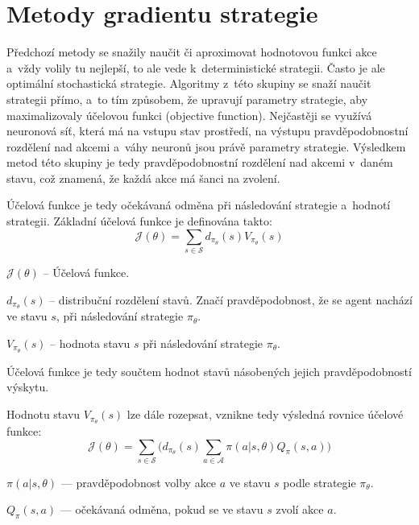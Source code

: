\section{Metody gradientu strategie}\label{subsec:gradientni_metody}
Předchozí metody se snažily naučit či aproximovat hodnotovou funkci akce a~vždy volily tu nejlepší, to ale vede k~deterministické strategii.
Často je ale optimální stochastická strategie.
Algoritmy z~této skupiny se snaží naučit strategii přímo, a~to tím způsobem, že upravují parametry strategie, aby maximalizovaly účelovou funkci (objective function).
Nejčastěji se využívá neuronová síť, která má na vstupu stav prostředí, na výstupu pravděpodobnostní rozdělení nad akcemi a~váhy neuronů jsou právě parametry strategie.
Výsledkem metod této skupiny je tedy pravděpodobnostní rozdělení nad akcemi v~daném stavu, což znamená, že každá akce má šanci na zvolení.

Účelová funkce je tedy očekávaná odměna při následování strategie a~hodnotí strategii.
Základní účelová funkce je definována takto:
\begin{equation}
    \label{eq:ucelova_funkce_spojita}
  \mathcal{J}(\theta) = \sum_{s \in \mathcal{S}} d_{\pi_\theta}(s) V_{\pi_\theta}(s)
  \end{equation}

\begin{myitemize}
  \item $\mathcal{J}(\theta)$ -- Účelová funkce.
  \item $d_{\pi_\theta}(s)$ -- distribuční rozdělení stavů. Značí pravděpodobnost, že se agent nachází ve stavu $s$, při následování strategie $\pi_\theta$.
  \item $V_{\pi_\theta}(s)$ -- hodnota stavu $s$ při následování strategie $\pi_\theta$.\par
  \item Účelová funkce je tedy součtem hodnot stavů násobených jejich pravděpodobností výskytu.
\end{myitemize}

Hodnotu stavu $V_{\pi_\theta}(s)$ lze dále rozepsat, vznikne tedy výsledná rovnice účelové funkce:
\begin{equation}
  \mathcal{J}(\theta) = \sum_{s \in \mathcal{S}} \Big( d_{\pi_\theta}(s) \sum_{a \in \mathcal{A}} \pi(a \vert s, \theta) Q_\pi(s, a) \Big)
\end{equation}

\begin{myitemize}
  \item $\pi(a \vert s, \theta)$ --- pravděpodobnost volby akce $a$ ve stavu $s$ podle strategie $\pi_\theta$.
  \item $Q_\pi(s, a)$ --- očekávaná odměna, pokud se ve stavu $s$ zvolí akce $a$.
\end{myitemize}

